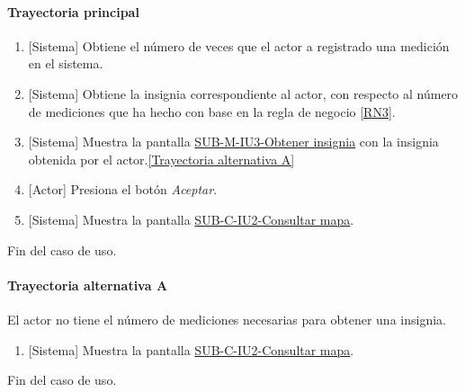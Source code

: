 \paragraph{Trayectoria principal}
	\begin{enumerate}
		\item {[Sistema]} Obtiene el número de veces que el actor a registrado una medición en el sistema.
		\item {[Sistema]} Obtiene la insignia correspondiente al actor, con respecto al número de mediciones que ha hecho con base en la regla de negocio \ref{RN3}.
		\item {[Sistema]} Muestra la pantalla \hyperref[fig:sub-m-1.1.3]{SUB-M-IU3-Obtener insignia} con la insignia obtenida por el actor.\hyperref[SUB-M-CU1.1.3:TA]{[Trayectoria alternativa A]}
		\item {[Actor]} Presiona el botón \textit{Aceptar}.
		\item {[Sistema]} Muestra la pantalla \hyperref[fig:sub-c-iu2]{SUB-C-IU2-Consultar mapa}.
	\end{enumerate}
	Fin del caso de uso.

\paragraph{Trayectoria alternativa A} \label{SUB-M-CU1.1.3:TA}
	El actor no tiene el número de mediciones necesarias para obtener una insignia.
	\begin{enumerate}[label=A\arabic*.]
		\item {[Sistema]} Muestra la pantalla \hyperref[fig:sub-c-iu2]{SUB-C-IU2-Consultar mapa}.
	\end{enumerate}
	Fin del caso de uso.